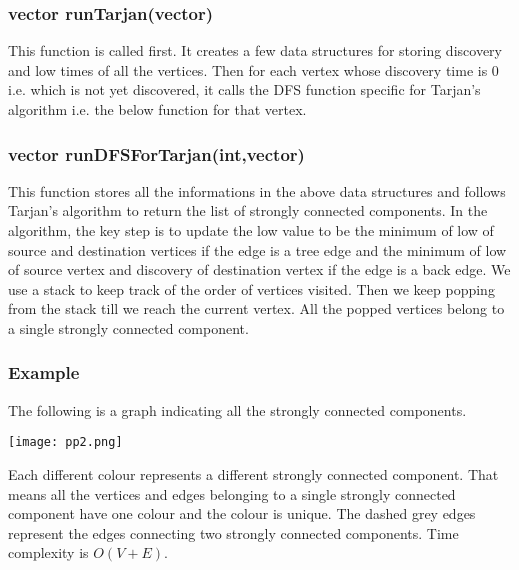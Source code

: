 \documentclass{article}
\begin{document}
\subsubsection{vector runTarjan(vector)}
\label{tarjan}
This function is called first. It creates a few data structures for storing discovery and low times of all the vertices. Then for each vertex whose discovery time is 0 i.e. which is not yet discovered, it calls the DFS function specific for Tarjan's algorithm i.e. the below function for that vertex.
\subsubsection{vector runDFSForTarjan(int,vector)}
This function stores all the informations in the above data structures and follows Tarjan's algorithm to return the list of strongly connected components. In the algorithm, the key step is to update the low value to be the minimum of low of source and destination vertices if the edge is a tree edge and the minimum of low of source vertex and discovery of destination vertex if the edge is a back edge. We use a stack to keep track of the order of vertices visited. Then we keep popping from the stack till we reach the current vertex. All the popped vertices belong to a single strongly connected component.
\subsubsection{Example}
The following is a graph indicating all the strongly connected components.
\begin{center}
\texttt{[image: pp2.png]}
\end{center}
Each different colour represents a different strongly connected component. That means all the vertices and edges belonging to a single strongly connected component have one colour and the colour is unique. The dashed grey edges represent the edges connecting two strongly connected components.\newline
Time complexity is $O(V+E)$.
\end{document}
